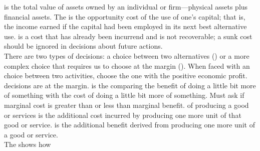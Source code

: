\documentclass{article}
\begin{document}
 is the total value of assets owned by an individual or firm---physical assets plus financial assets. The  is the opportunity cost of the use of one's capital; that is, the income earned if the capital had been employed in its next best alternative use.  is a cost that has already been incurrend and is not recoverable; a sunk cost should be ignored in decisions about future actions. \\ 

There are two types of decisions: a choice between two alternatives () or a more complex choice that requires us to choose at the margin (). When faced with an  choice between two activities, choose the one with the positive economic profit.  decisions are at the margin.  is the comparing the benefit of doing a little bit more of something with the cost of doing a little bit more of something. Must ask if marginal cost is greater than or less than marginal benefit.  of producing a good or services is the additional cost incurred by producing one more unit of that good or service.  is the additional benefit derived from producing one more unit of a good or service. \\ 

The  shows how
 
\end{document}
